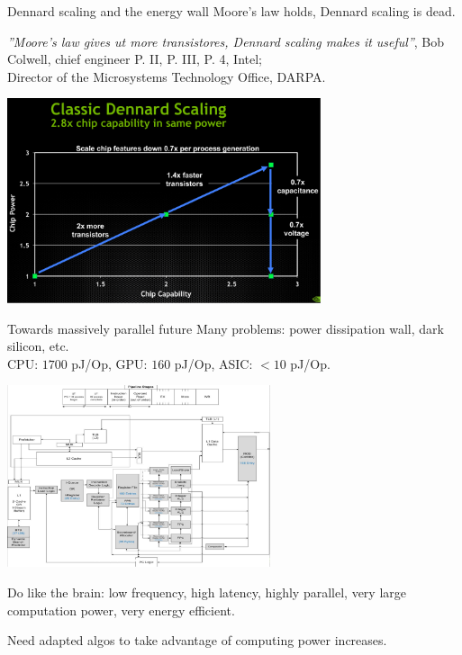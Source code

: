 \documentclass{beamer}
\begin{document}
\begin{frame}{Dennard scaling and the energy wall}
    Moore's law holds, Dennard scaling is dead.

    \begin{center}
        \textit{''Moore's law gives ut more transistores, Dennard scaling makes it useful''}, Bob Colwell, chief engineer P. II, P. III, P. 4, Intel; \\ Director of the Microsystems Technology Office, DARPA.
    \end{center}

    \begin{center}
      \includegraphics[width=0.69\textwidth]{./Figures/CPUs_vs_GPUs/classic_dennard}
    \end{center}
\end{frame}



\begin{frame}{Towards massively parallel future}
    Many problems: power dissipation wall, dark silicon, etc. \\

    CPU: $1700$ pJ/Op, GPU: $160$ pJ/Op, ASIC: $<10$ pJ/Op.

    \begin{center}
      \includegraphics[width=0.58\textwidth]{./Figures/CPUs_vs_GPUs/overview_architecture}
    \end{center}

    Do like the brain: low frequency, high latency, highly parallel, very large computation power, very energy efficient.

    \begin{center}
      Need adapted algos to take advantage of computing power increases.
    \end{center}
\end{frame}
\end{document}
